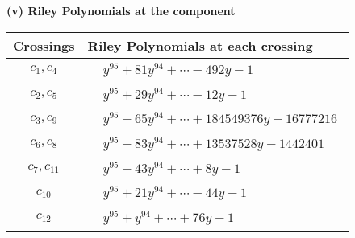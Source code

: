 \documentclass[1p]{elsarticle_modified}
\theoremstyle{definition}
\begin{document}
\newpage\renewcommand{\arraystretch}{1}
\flushleft \textbf{(v) Riley Polynomials at the component}\newline \\
\begin{tabular}{m{50pt}|m{274pt}}
Crossings & \hspace{64pt}Riley Polynomials at each crossing \\
\hline $$\begin{aligned}c_{1},c_{4}\end{aligned}$$&$\begin{aligned}
&y^{95}+81 y^{94}+\cdots-492 y-1
\end{aligned}$\\
\hline $$\begin{aligned}c_{2},c_{5}\end{aligned}$$&$\begin{aligned}
&y^{95}+29 y^{94}+\cdots-12 y-1
\end{aligned}$\\
\hline $$\begin{aligned}c_{3},c_{9}\end{aligned}$$&$\begin{aligned}
&y^{95}-65 y^{94}+\cdots+184549376 y-16777216
\end{aligned}$\\
\hline $$\begin{aligned}c_{6},c_{8}\end{aligned}$$&$\begin{aligned}
&y^{95}-83 y^{94}+\cdots+13537528 y-1442401
\end{aligned}$\\
\hline $$\begin{aligned}c_{7},c_{11}\end{aligned}$$&$\begin{aligned}
&y^{95}-43 y^{94}+\cdots+8 y-1
\end{aligned}$\\
\hline $$\begin{aligned}c_{10}\end{aligned}$$&$\begin{aligned}
&y^{95}+21 y^{94}+\cdots-44 y-1
\end{aligned}$\\
\hline $$\begin{aligned}c_{12}\end{aligned}$$&$\begin{aligned}
&y^{95}+y^{94}+\cdots+76 y-1
\end{aligned}$\\
\hline
\end{tabular}\\~\\
\end{document}
